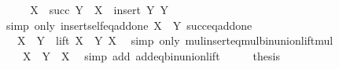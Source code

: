 \begin{isabellebody}
%
\isadelimproof
%
\endisadelimproof
%
\isatagproof
{}\isamarkupfalse%
\ {\isacharminus}{\kern0pt}\isanewline
\ \ \isamarkupfalse%
\ {\isachardoublequoteopen}X\ {\isacharasterisk}{\kern0pt}\ succ\ Y\ {\isacharequal}{\kern0pt}\ X\ {\isacharasterisk}{\kern0pt}\ {\isacharparenleft}{\kern0pt}insert\ Y\ Y{\isacharparenright}{\kern0pt}{\isachardoublequoteclose}\isanewline
\ \ \ \ \isamarkupfalse%
\ {\isacharparenleft}{\kern0pt}simp\ only{\isacharcolon}{\kern0pt}\ insert{\isacharunderscore}{\kern0pt}self{\isacharunderscore}{\kern0pt}eq{\isacharunderscore}{\kern0pt}add{\isacharunderscore}{\kern0pt}one{\isacharbrackleft}{\kern0pt}\ {\isacharquery}{\kern0pt}X\ {\isacharequal}{\kern0pt}\ Y{\isacharbrackright}{\kern0pt}\ succ{\isacharunderscore}{\kern0pt}eq{\isacharunderscore}{\kern0pt}add{\isacharunderscore}{\kern0pt}one{\isacharparenright}{\kern0pt}\isanewline
\ \ \isamarkupfalse%
\ \isamarkupfalse%
\ {\isachardoublequoteopen}{\isachardot}{\kern0pt}{\isachardot}{\kern0pt}{\isachardot}{\kern0pt}\ {\isacharequal}{\kern0pt}\ {\isacharparenleft}{\kern0pt}X\ {\isacharasterisk}{\kern0pt}\ Y{\isacharparenright}{\kern0pt}\ {\isasymunion}\ lift\ {\isacharparenleft}{\kern0pt}X\ {\isacharasterisk}{\kern0pt}\ Y{\isacharparenright}{\kern0pt}\ X{\isachardoublequoteclose}\ \isamarkupfalse%
\ {\isacharparenleft}{\kern0pt}simp\ only{\isacharcolon}{\kern0pt}\ mul{\isacharunderscore}{\kern0pt}insert{\isacharunderscore}{\kern0pt}eq{\isacharunderscore}{\kern0pt}mul{\isacharunderscore}{\kern0pt}bin{\isacharunderscore}{\kern0pt}union{\isacharunderscore}{\kern0pt}lift{\isacharunderscore}{\kern0pt}mul{\isacharparenright}{\kern0pt}\isanewline
\ \ \isamarkupfalse%
\ \isamarkupfalse%
\ {\isachardoublequoteopen}\ {\isachardot}{\kern0pt}{\isachardot}{\kern0pt}{\isachardot}{\kern0pt}\ {\isacharequal}{\kern0pt}\ {\isacharparenleft}{\kern0pt}X\ {\isacharasterisk}{\kern0pt}\ Y{\isacharparenright}{\kern0pt}\ {\isacharplus}{\kern0pt}\ X{\isachardoublequoteclose}\ \isamarkupfalse%
\ {\isacharparenleft}{\kern0pt}simp\ add{\isacharcolon}{\kern0pt}\ add{\isacharunderscore}{\kern0pt}eq{\isacharunderscore}{\kern0pt}bin{\isacharunderscore}{\kern0pt}union{\isacharunderscore}{\kern0pt}lift{\isacharparenright}{\kern0pt}\isanewline
\ \ \isamarkupfalse%
\ \isamarkupfalse%
\ {\isacharquery}{\kern0pt}thesis\ \isacommand{{\isachardot}{\kern0pt}}\isamarkupfalse%
\isanewline
{}\isamarkupfalse%
%
\endisatagproof

\end{isabellebody}
